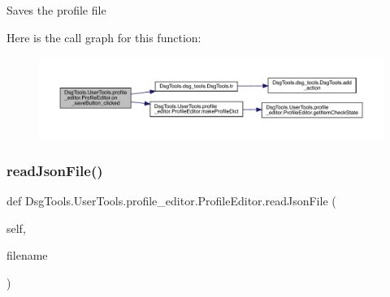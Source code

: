 \begin{DoxyVerb}Saves the profile file
\end{DoxyVerb}
 Here is the call graph for this function\+:
\nopagebreak
\begin{figure}[H]
\begin{center}
\leavevmode
\includegraphics[width=350pt]{class_dsg_tools_1_1_user_tools_1_1profile__editor_1_1_profile_editor_aff1a716418372461a0d445d3482da1d8_cgraph}
\end{center}
\end{figure}
\mbox{\label{class_dsg_tools_1_1_user_tools_1_1profile__editor_1_1_profile_editor_ae0b939974176fcb27653d2af4bdf7234}} 
\subsubsection{\texorpdfstring{read\+Json\+File()}{readJsonFile()}}
{\footnotesize\ttfamily def Dsg\+Tools.\+User\+Tools.\+profile\+\_\+editor.\+Profile\+Editor.\+read\+Json\+File (\begin{DoxyParamCaption}\item[{}]{self,  }\item[{}]{filename }\end{DoxyParamCaption})}

